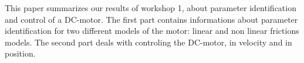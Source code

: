 This paper summarizes our results of workshop 1, about  parameter identification and control of a DC-motor. The first part contains informations about parameter identification for two different models of the motor: linear and non linear frictions models. The second part deals with controling the DC-motor, in velocity and in position. 